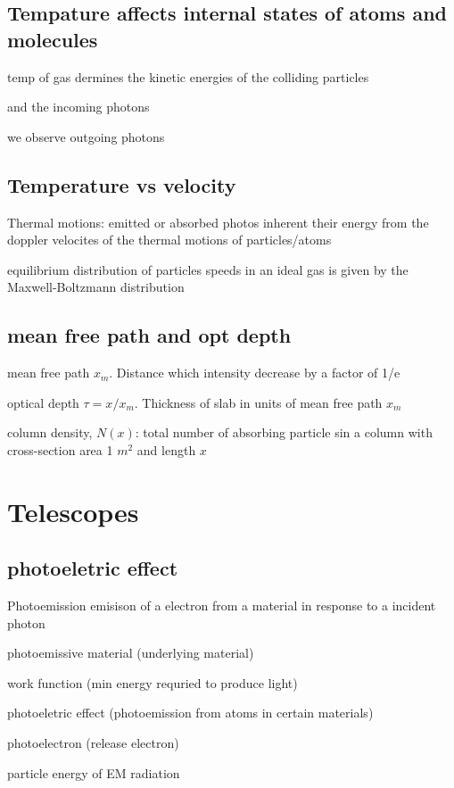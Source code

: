 \documentclass{article}
\begin{document}
\subsection{Tempature affects internal states of atoms and molecules}
\begin{list}{-}{}
\item temp of gas dermines the kinetic energies of the colliding particles
\item and the incoming photons
\item we observe outgoing photons
\end{list}

\subsection{Temperature vs velocity}
\begin{list}{-}{}
\item Thermal motions: emitted or absorbed photos inherent their energy from the doppler velocites of the thermal motions of particles/atoms
\item equilibrium distribution of particles speeds in an ideal gas is given by the Maxwell-Boltzmann distribution
\end{list}

\subsection{mean free path and opt depth}

\begin{list}{-}{}
\item mean free path $x_m$. Distance which intensity decrease by a factor of 1/e
\item optical depth $\tau = x/x_m$. Thickness of slab in units of mean free path $x_m$
\item column density, $N(x)$: total number of absorbing particle sin a column with cross-section area 1 $m^2$ and length $x$
\end{list}

\section{Telescopes}
\subsection{photoeletric effect}
\begin{list}{-}{}
\item Photoemission emisison of a electron from a material in response to a incident photon
\begin{list}{-}{}
\item photoemissive material (underlying material)
\item work function (min energy requried to produce light)
\item photoeletric effect (photoemission from atoms in certain materials)
\item photoelectron (release electron)
\end{list}
\item particle energy of EM radiation 
\end{list}
\end{document}
